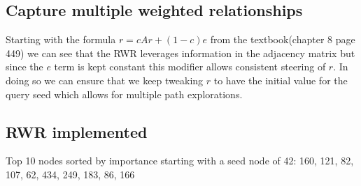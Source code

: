 \documentclass[11pt]{article}
\begin{document}
\subsection{Capture multiple weighted relationships}
Starting with the formula $r = cAr + (1 − c)e$ from the textbook(chapter 8 page 449) we can see that the RWR leverages information in the adjacency matrix but since the $e$ term is kept constant this modifier allows consistent steering of $r$. In doing so we can ensure that we keep tweaking $r$ to have the initial value for the query seed which allows for multiple path explorations.  
\subsection{RWR implemented}
Top 10 nodes sorted by importance starting with a seed node of 42: 160, 121, 82, 107, 62, 434, 249, 183, 86, 166
\end{document}
